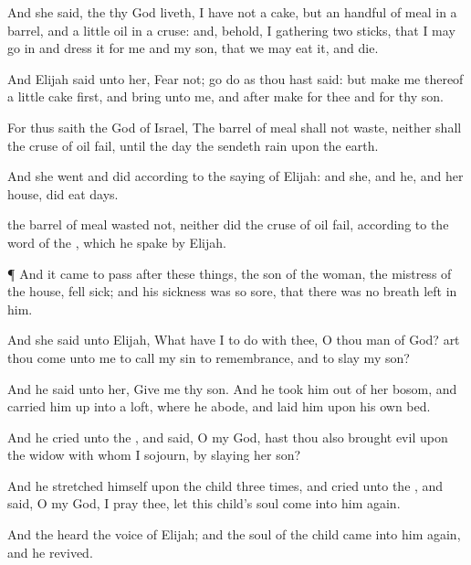 {And she
said,
{} the
{} thy
God
liveth, I
have not a
cake, but an
handful of
meal in a
barrel, and a
little
oil in a
cruse: and, behold, I
{}
gathering
two
sticks, that I may go
in and
dress it for me and my
son, that we may
eat it, and
die.

And
Elijah
said unto her,
Fear not;
go
{}
do as thou hast
said: but
make me
thereof a
little
cake
first, and
bring
{} unto me, and
after
make for thee and for thy
son.

For thus
saith the
{}
God of
Israel, The
barrel of
meal shall not
waste, neither shall the
cruse of
oil
fail, until the
day
{} the
{}
sendeth
rain
upon the
earth.

And she
went and
did according to the
saying of
Elijah: and she, and he, and her
house, did
eat
{}
days.

 the
barrel of
meal
wasted not, neither did the
cruse of
oil
fail, according to the
word of the
{}, which he
spake
by
Elijah.


\par }{\PP {}¶ And it came to pass
after these
things,
{} the
son of the
woman, the
mistress of the
house, fell
sick; and his
sickness was
so
sore, that there was no
breath
left in him.

And she
said unto
Elijah, What have I to do with thee, O thou
man of
God? art thou
come unto me to
call my
sin to
remembrance, and to
slay my
son?

And he
said unto her,
Give me thy
son. And he
took him out of her
bosom, and carried him
up into a
loft, where he
abode, and
laid him upon his own
bed.

And he
cried unto the
{}, and
said, O
{} my
God, hast thou also brought
evil upon the
widow with whom I
sojourn, by
slaying her
son?

And he
stretched himself upon the
child
three
times, and
cried unto the
{}, and
said, O
{} my
God, I pray thee, let this
child’s
soul
come into
him
again.

And the
{}
heard the
voice of
Elijah; and the
soul of the
child
came into
him
again, and he
revived.

}
